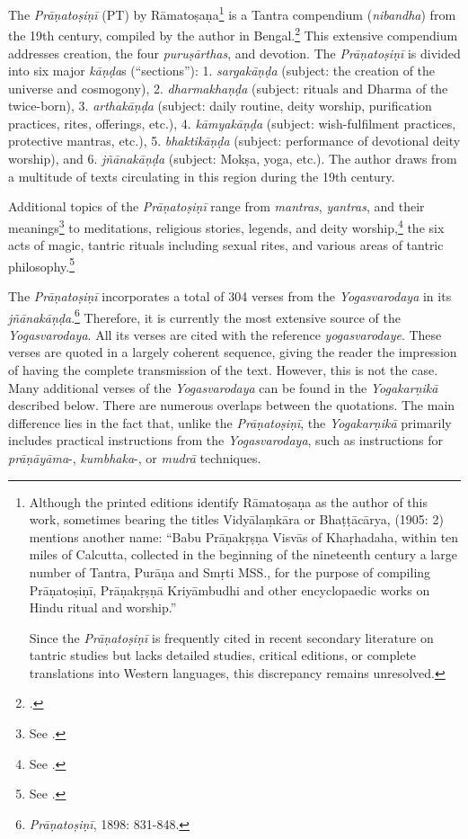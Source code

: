 The \textit{Prāṇatoṣiṇī} (PT) by Rāmatoṣaṇa\footnote{Although the printed editions identify Rāmatoṣaṇa as the author of this work, sometimes bearing the titles Vidyālaṃkāra or Bhaṭṭācārya, \citeauthor{shastri1905} (1905: 2) mentions another name: ``Babu Prāṇakṛṣṇa Visvās of Khaṛhadaha, within ten miles of Calcutta, collected in the beginning of the nineteenth century a large number of Tantra, Purāṇa and Smṛti MSS., for the purpose of compiling Prāṇatoṣiṇī, Prāṇakṛṣṇā Kriyāmbudhi and other encyclopaedic works on Hindu ritual and worship.''

Since the \textit{Prāṇatoṣiṇī} is frequently cited in recent secondary literature on tantric studies but lacks detailed studies, critical editions, or complete translations into Western languages, this discrepancy remains unresolved.} is a Tantra compendium (\textit{nibandha}) from the 19th century, compiled by the author in Bengal.\footnote{\cite{ramatosana}.} This extensive compendium addresses creation, the four \textit{puruṣārthas}, and devotion. The \textit{Prāṇatoṣiṇī} is divided into six major \textit{kāṇḍa}s (``sections''): 1. \textit{sargakāṇḍa} (subject: the creation of the universe and cosmogony), 2. \textit{dharmakhaṇḍa} (subject: rituals and Dharma of the twice-born), 3. \textit{arthakāṇḍa} (subject: daily routine, deity worship, purification practices, rites, offerings, etc.), 4. \textit{kāmyakāṇḍa} (subject: wish-fulfilment practices, protective mantras, etc.), 5. \textit{bhaktikāṇḍa} (subject: performance of devotional deity worship), and 6. \textit{jñānakāṇḍa} (subject: Mokṣa, yoga, etc.). The author draws from a multitude of texts circulating in this region during the 19th century.

Additional topics of the \textit{Prāṇatoṣiṇī} range from \textit{mantras}, \textit{yantras}, and their meanings\footnote{See \citeauthor[2010: 69-70]{slouber2010}.} to meditations, religious stories, legends, and deity worship,\footnote{See \citeauthor[1997: 149-150]{kinsley1997}.} the six acts of magic, tantric rituals including sexual rites, and various areas of tantric philosophy.\footnote{See \citeauthor[2010: 100]{urban2010}.}

The \textit{Prāṇatoṣiṇī} incorporates a total of 304 verses from the \textit{Yogasvarodaya} in its \textit{jñānakāṇḍa}.\footnote{\emph{Prāṇatoṣiṇī}, 1898: 831-848.} Therefore, it is currently the most extensive source of the \emph{Yogasvarodaya}. All its verses are cited with the reference \textit{yogasvarodaye}. These verses are quoted in a largely coherent sequence, giving the reader the impression of having the complete transmission of the text. However, this is not the case. Many additional verses of the \emph{Yogasvarodaya} can be found in the \emph{Yogakarṇikā} described below. There are numerous overlaps between the quotations. The main difference lies in the fact that, unlike the \textit{Prāṇatoṣiṇī}, the \emph{Yogakarṇikā} primarily includes practical instructions from the \textit{Yogasvarodaya}, such as instructions for \textit{prāṇāyāma}-, \textit{kumbhaka}-, or \textit{mudrā} techniques.

